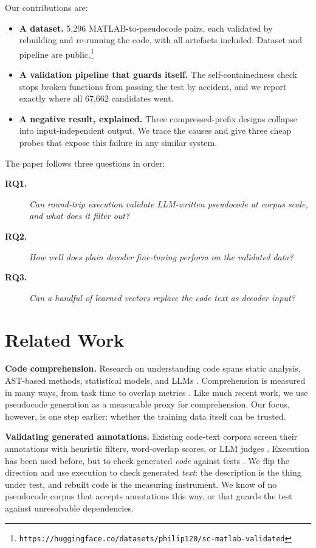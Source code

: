 \documentclass[conference]{IEEEtran}
\newcommand{\FunnelTotal}{67{,}662}        %
\newcommand{\NAccepted}{5{,}296}           %
\begin{document}
Our contributions are:
\begin{itemize}
    \item \textbf{A dataset.} \NAccepted{} MATLAB-to-pseudocode pairs, each validated by rebuilding and re-running the code, with all artefacts included. Dataset and pipeline are public.\footnote{\texttt{https://huggingface.co/datasets/philip120/sc-matlab-validated}}
    \item \textbf{A validation pipeline that guards itself.} The self-containedness check stops broken functions from passing the test by accident, and we report exactly where all \FunnelTotal{} candidates went.
    \item \textbf{A negative result, explained.} Three compressed-prefix designs collapse into input-independent output. We trace the causes and give three cheap probes that expose this failure in any similar system.
\end{itemize}

The paper follows three questions in order:
\begin{description}
    \item[\textbf{RQ1.}] \textit{Can round-trip execution validate LLM-written pseudocode at corpus scale, and what does it filter out?}
    \item[\textbf{RQ2.}] \textit{How well does plain decoder fine-tuning perform on the validated data?}
    \item[\textbf{RQ3.}] \textit{Can a handful of learned vectors replace the code text as decoder input?}
\end{description}

\section{Related Work}
\label{sec:related}

\textbf{Code comprehension.} Research on understanding code spans static analysis, AST-based methods, statistical models, and LLMs \cite{husak2025combiningstaticanalysistechniques,SIRBU2025125821,sun2023abstractsyntaxtreeprogramming,4815280}. Comprehension is measured in many ways, from task time to overlap metrics \cite{2411.14491,feitelson2021considerations,boehm1978quantitative}. Like much recent work, we use pseudocode generation as a measurable proxy for comprehension. Our focus, however, is one step earlier: whether the training data itself can be trusted.

\textbf{Validating generated annotations.} Existing code-text corpora screen their annotations with heuristic filters, word-overlap scores, or LLM judges \cite{yuan2023evaluatinginstructiontunedlargelanguage}. Execution has been used before, but to check generated \emph{code} against tests \cite{chen2018execution,shojaee2023execution}. We flip the direction and use execution to check generated \emph{text}: the description is the thing under test, and rebuilt code is the measuring instrument. We know of no pseudocode corpus that accepts annotations this way, or that guards the test against unresolvable dependencies.
\end{document}
